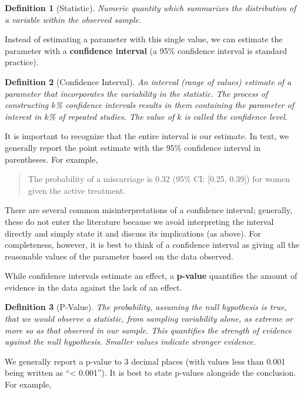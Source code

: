 \documentclass[
]{book}
\theoremstyle{plain}
\theoremstyle{mydefn}
\newtheorem{definition}{Definition}[chapter]
\theoremstyle{myexmpl}
\theoremstyle{remark}
\begin{document}
\begin{definition}[Statistic]
Numeric quantity which summarizes the distribution of a variable within the observed \emph{sample}.
\end{definition}

Instead of estimating a parameter with this single value, we can estimate the parameter with a \textbf{confidence interval} (a 95\% confidence interval is standard practice).

\begin{definition}[Confidence Interval]
An interval (range of values) estimate of a parameter that incorporates the variability in the statistic. The process of constructing \(k\)\% confidence intervals results in them containing the parameter of interest in \(k\)\% of repeated studies. The value of \(k\) is called the \emph{confidence level}.
\end{definition}

It is important to recognize that the entire interval is our estimate. In text, we generally report the point estimate with the 95\% confidence interval in parentheses. For example,

\begin{quote}
The probability of a miscarriage is 0.32 (95\% CI: {[}0.25, 0.39{]}) for women given the active treatment.
\end{quote}

There are several common misinterpretations of a confidence interval; generally, these do not enter the literature because we avoid interpreting the interval directly and simply state it and discuss its implications (as above). For completeness, however, it is best to think of a confidence interval as giving all the reasonable values of the parameter based on the data observed.

While confidence intervals estimate an effect, a \textbf{p-value} quantifies the amount of evidence in the data against the lack of an effect.

\begin{definition}[P-Value]
The probability, assuming the null hypothesis is true, that we would observe a statistic, from sampling variability alone, as extreme or more so as that observed in our sample. This quantifies the strength of evidence against the null hypothesis. Smaller values indicate stronger evidence.
\end{definition}

We generally report a p-value to 3 decimal places (with values less than 0.001 being written as ``\textless{} 0.001''). It is best to state p-values alongside the conclusion. For example,
\end{document}
